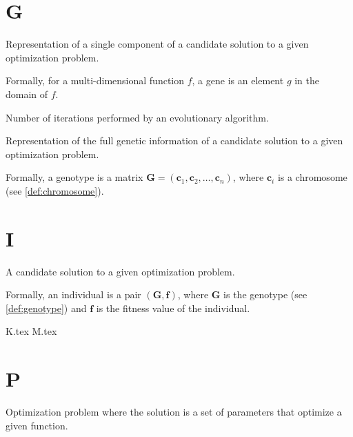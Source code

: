   \section*{G}
    \begin{definition}[Gene]
    \label{def:gene}
      Representation of a single component of a candidate solution to a given optimization problem.

      Formally, for a multi-dimensional function \(f\), a gene is an element \(g\) in the domain of
      \(f\).
    \end{definition}

    \begin{definition}[Generation]
    \label{def:generation}
      Number of iterations performed by an evolutionary algorithm.
    \end{definition}

    \begin{definition}[Genotype]
    \label{def:genotype}
      Representation of the full genetic information of a candidate solution to a given optimization
      problem.

      Formally, a genotype is a matrix \(\mathbf{G} = (\textbf{c}_1, \textbf{c}_2, \dots, 
      \textbf{c}_n)\), where \(\textbf{c}_i\) is a chromosome (see \vref{def:chromosome}).
    \end{definition}

  \section*{I}
    \begin{definition}[Individual]
    \label{def:individual}
      A candidate solution to a given optimization problem.

      Formally, an individual is a pair \((\mathbf{G}, \mathbf{f})\), where \(\mathbf{G}\) is the
      genotype (see \vref{def:genotype}) and \(\mathbf{f}\) is the fitness value of the
      individual.
    \end{definition}
    
  {K.tex}
  {M.tex}

  \section*{P}
    \begin{definition}
    \label{def:parameter_optimization}
      Optimization problem where the solution is a set of parameters that 
      optimize a given function.
    \end{definition}

